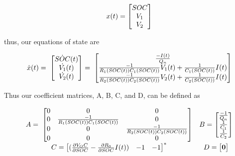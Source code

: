 \documentclass[12pt]{article}
\begin{document}
\begin{equation}
\centering 
x(t) =
\begin{bmatrix}
SOC \\ V_1 \\ V_2 
\end{bmatrix}
\end{equation}

thus, our equations of state are 

\begin{equation}
\centering
\dot{x}(t) = \;
\begin{bmatrix}
\dot{SOC} (t) \\
\dot{V_1} (t) \\
\dot{V_2} (t) \\
\end{bmatrix} 
= \;
\begin{bmatrix}
\frac{-I(t)}{Q_n} \\
\frac{-1}{R_1(SOC(t))C_1(SOC(t))}V_1(t) + \frac{1}{C_1(SOC(t))}I(t) \\
\frac{-1}{R_2(SOC(t))C_2(SOC(t))}V_2(t) + \frac{1}{C_2(SOC(t))}I(t) 
\end{bmatrix}
\end{equation}

Thus our coefficient matrices, A, B, C, and D, can be defined as 

\begin{equation}
\centering
\begin{matrix}
A = \;
\begin{bmatrix}
0 & 0 & 0  \\
0 & \frac{-1}{R_1(SOC(t))C_1(SOC(t))} & 0  \\
0 & 0 & \frac{-1}{R_2(SOC(t))C_2(SOC(t))}  \\
0 & 0 & 0 \\
\end{bmatrix} 

& 

B = 
\begin{bmatrix}
\frac{-1}{Q_n} \\
\frac{1}{C_1} \\
\frac{1}{C_2} \\
\end{bmatrix}

\\

C = \begin{bmatrix}

(\frac{\partial{V_OC}}{\partial{SOC}} - \frac{\partial{R_0}}{\partial{SOC}}I(t)) & -1 & -1

\end{bmatrix}^*

&

D = \begin{bmatrix}
\bold{0}
\end{bmatrix}
\end{matrix}
\end{equation}
\end{document}
